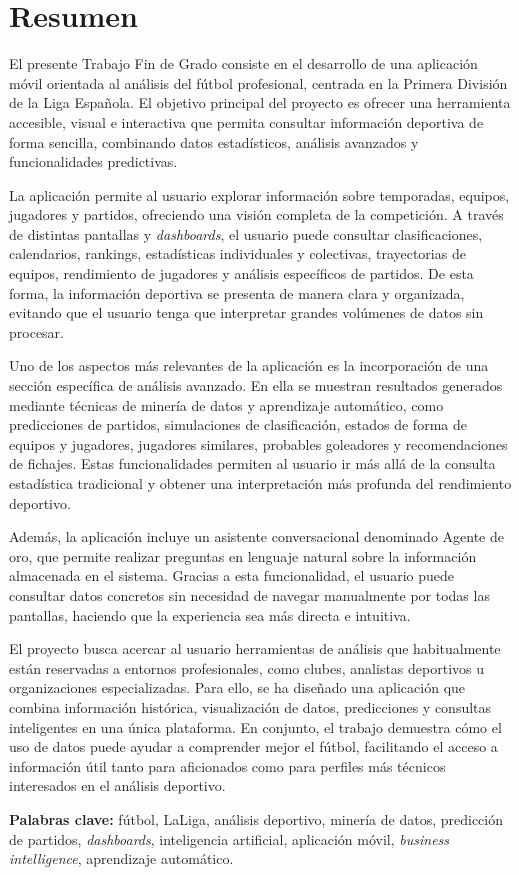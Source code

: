 \newpage{\ }
\thispagestyle{empty}
\chapter*{Resumen}

\noindent El presente Trabajo Fin de Grado consiste en el desarrollo de una aplicación móvil orientada al análisis del fútbol profesional, centrada en la Primera División de la Liga Española. El objetivo principal del proyecto es ofrecer una herramienta accesible, visual e interactiva que permita consultar información deportiva de forma sencilla, combinando datos estadísticos, análisis avanzados y funcionalidades predictivas.

La aplicación permite al usuario explorar información sobre temporadas, equipos, jugadores y partidos, ofreciendo una visión completa de la competición. A través de distintas pantallas y \textit{dashboards}, el usuario puede consultar clasificaciones, calendarios, rankings, estadísticas individuales y colectivas, trayectorias de equipos, rendimiento de jugadores y análisis específicos de partidos. De esta forma, la información deportiva se presenta de manera clara y organizada, evitando que el usuario tenga que interpretar grandes volúmenes de datos sin procesar.

Uno de los aspectos más relevantes de la aplicación es la incorporación de una sección específica de análisis avanzado. En ella se muestran resultados generados mediante técnicas de minería de datos y aprendizaje automático, como predicciones de partidos, simulaciones de clasificación, estados de forma de equipos y jugadores, jugadores similares, probables goleadores y recomendaciones de fichajes. Estas funcionalidades permiten al usuario ir más allá de la consulta estadística tradicional y obtener una interpretación más profunda del rendimiento deportivo.

Además, la aplicación incluye un asistente conversacional denominado Agente de oro, que permite realizar preguntas en lenguaje natural sobre la información almacenada en el sistema. Gracias a esta funcionalidad, el usuario puede consultar datos concretos sin necesidad de navegar manualmente por todas las pantallas, haciendo que la experiencia sea más directa e intuitiva.

El proyecto busca acercar al usuario herramientas de análisis que habitualmente están reservadas a entornos profesionales, como clubes, analistas deportivos u organizaciones especializadas. Para ello, se ha diseñado una aplicación que combina información histórica, visualización de datos, predicciones y consultas inteligentes en una única plataforma. En conjunto, el trabajo demuestra cómo el uso de datos puede ayudar a comprender mejor el fútbol, facilitando el acceso a información útil tanto para aficionados como para perfiles más técnicos interesados en el análisis deportivo.

\vspace{.5cm}

\noindent \textbf{Palabras clave:} fútbol, LaLiga, análisis deportivo, minería de datos, predicción de partidos, \textit{dashboards}, inteligencia artificial, aplicación móvil, \textit{business intelligence}, aprendizaje automático.